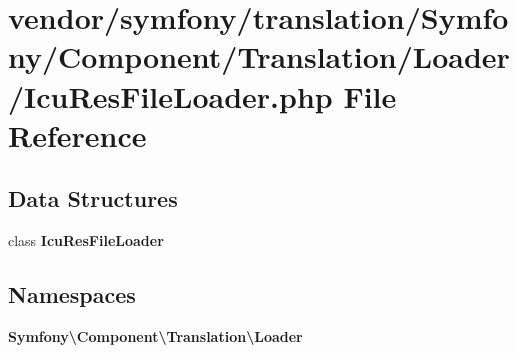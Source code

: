 \section{vendor/symfony/translation/\+Symfony/\+Component/\+Translation/\+Loader/\+Icu\+Res\+File\+Loader.php File Reference}
\label{_icu_res_file_loader_8php}
\subsection*{Data Structures}
\begin{DoxyCompactItemize}
\item 
class {\bf Icu\+Res\+File\+Loader}
\end{DoxyCompactItemize}
\subsection*{Namespaces}
\begin{DoxyCompactItemize}
\item 
 {\bf Symfony\textbackslash{}\+Component\textbackslash{}\+Translation\textbackslash{}\+Loader}
\end{DoxyCompactItemize}
